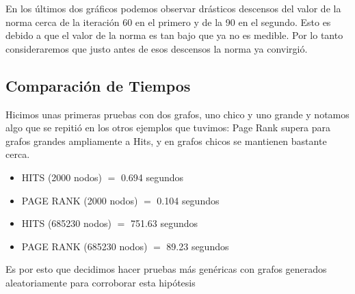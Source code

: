 En los últimos dos gráficos podemos observar drásticos descensos del valor de la norma cerca de la iteración 60 en el primero y de la 90 en el segundo. Esto es debido a que el valor de la norma es tan bajo que ya no es medible. Por lo tanto consideraremos que justo antes de esos descensos la norma ya convirgió.

\clearpage

\subsection{Comparación de Tiempos}


Hicimos unas primeras pruebas con dos grafos, uno chico y uno grande y notamos algo que se repitió en los otros ejemplos que tuvimos: Page Rank supera para grafos grandes ampliamente a Hits, y en grafos chicos se mantienen bastante cerca.

\begin{itemize}
\item{HITS (2000 nodos) $=$ 0.694 segundos }
\item{PAGE RANK (2000 nodos) $=$ 0.104 segundos }
\item{HITS (685230 nodos) $=$ 751.63 segundos }
\item{PAGE RANK (685230 nodos) $=$ 89.23 segundos }
\end{itemize}

Es por esto que decidimos hacer pruebas más genéricas con grafos generados aleatoriamente para corroborar esta hipótesis





